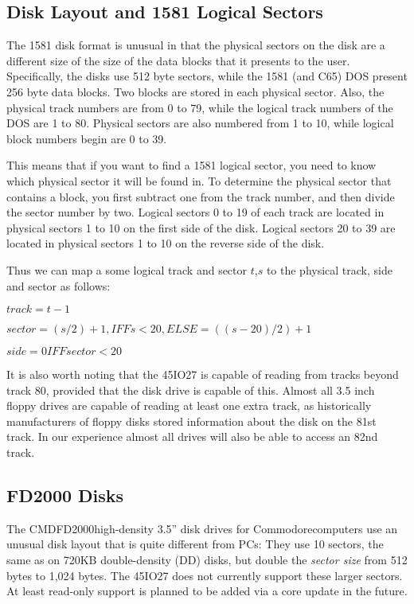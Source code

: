 \subsection{Disk Layout and 1581 Logical Sectors}

The 1581 disk format is unusual in that the physical sectors on the
disk are a different size of the size of the data blocks that it
presents to the user.  Specifically, the disks use 512 byte sectors,
while the 1581 (and C65) DOS present 256 byte data blocks.
Two blocks are stored in each physical sector.  Also, the physical
track numbers are from 0 to 79, while the logical track numbers of the
DOS are 1 to 80.  Physical sectors are also numbered from 1 to 10,
while logical block numbers begin are 0 to 39.

This means that if you want to find a 1581 logical sector, you need to
know which physical sector it will be found in.  To determine the
physical sector that contains a block, you first subtract one from the
track number, and then divide the sector number by two.  Logical
sectors 0 to 19 of each track are located in physical sectors 1 to 10
on the first side of the disk.  Logical sectors 20 to 39 are 
located in physical sectors 1 to 10 on the reverse side of the disk.  

Thus we can map a some logical track and sector $t$,$s$ to the
physical track, side and sector as follows:

$track = t - 1$

$sector = (s/2)+1, IFF s < 20, ELSE = ((s-20)/2) + 1$

$side = 0 IFF sector < 20$

It is also worth noting that the 45IO27 is capable of reading from
tracks beyond track 80, provided that the disk drive is capable of
this.  Almost all 3.5 inch floppy drives are capable of reading at
least one extra track, as historically manufacturers of floppy disks
stored information about the disk on the 81st track.  In our
experience almost all drives will also be able to access an 82nd
track.

\subsection{FD2000 Disks}

The CMD\texttrademark FD2000\texttrademark high-density 3.5'' disk drives for Commodore\texttrademark computers
use an unusual disk layout that is quite different from PCs: They use 10 sectors,
the same as on 720KB double-density (DD) disks, but double the {\em sector size}
from 512 bytes to 1,024 bytes.  The 45IO27 does not currently support these
larger sectors. At least read-only support is planned to be added via a core update
in the future.

